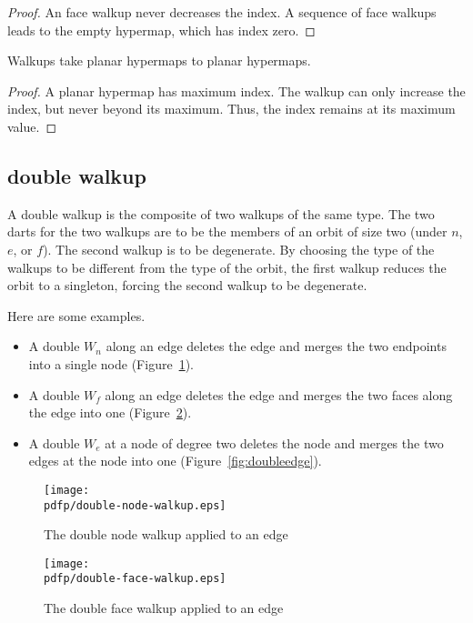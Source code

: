 \begin{proof}  An face walkup never decreases the index.  A sequence
of face walkups leads to the empty hypermap, which has
index zero.
\end{proof}


\begin{lemma}
Walkups take planar hypermaps to planar
hypermaps.
\end{lemma}

\begin{proof}  
A planar hypermap has maximum index.  The walkup
can only increase the index, but never beyond its maximum.  
Thus, the index remains at its maximum value.
\end{proof}


\subsection{double walkup}

A double walkup is the composite of two walkups of the same type.  The two darts for the two walkups  are to be the members of an orbit of size two (under $n$, $e$, or $f$).  
The second walkup is to be degenerate. By choosing the type of the walkups to be different from the type of the orbit, the first walkup reduces the orbit to a singleton, forcing the second walkup to be degenerate. 
 
Here are some examples.
\begin{itemize}
    \item A double $W_n$ along an edge deletes the edge and 
   merges the two endpoints into
    a single node (Figure~\ref{fig:doublenode}). 
    \item A double $W_f$ along an edge 
    deletes the edge and merges the two faces along the edge into
    one (Figure~\ref{fig:doubleface}).
    \item A double $W_e$ at a node of degree two
    deletes the node and merges the two edges at the node into
    one (Figure~\ref{fig:doubleedge}).
\end{itemize}


\begin{figure}[htb]
  \centering
  \texttt{[image: \\pdfp/double-node-walkup.eps]}
  \caption{The double node walkup applied to an edge}
  \label{fig:doublenode}
\end{figure}


\begin{figure}[htb]
  \centering
  \texttt{[image: \\pdfp/double-face-walkup.eps]}
  \caption{The double face walkup applied to an edge}
  \label{fig:doubleface}
\end{figure}


